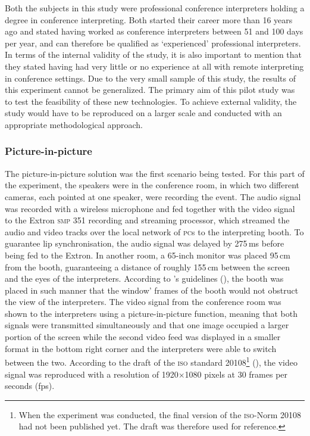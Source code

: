 \documentclass[output=paper]{langsci/langscibook}
\begin{document}
Both the subjects in this study were professional conference interpreters holding a degree in conference interpreting. Both started their career more than 16 years ago and stated having worked as conference interpreters between 51 and 100 days per year, and can therefore be qualified as ‘experienced’ professional interpreters. In terms of the internal validity of the study, it is also important to mention that they stated having had very little or no experience at all with remote interpreting in conference settings. Due to the very small sample of this study, the results of this experiment cannot be generalized. The primary aim of this pilot study was to test the feasibility of these new technologies. To achieve external validity, the study would have to be reproduced on a larger scale and conducted with an appropriate methodological approach.

\subsubsection{Picture-in-picture} 
\largerpage
The picture-in-picture solution was the first scenario being tested. For this part of the experiment, the speakers were in the conference room, in which two different cameras, each pointed at one speaker, were recording the event. The audio signal was recorded with a wireless microphone and fed together with the video signal to the Extron \textsc{smp 351} recording and streaming processor, which streamed the audio and video tracks over the local network of \textsc{pc}s to the interpreting booth. To guarantee lip synchronisation, the audio signal was delayed by 275\,ms before being fed to the Extron. In another room, a 65-inch monitor was placed 95\,cm from the booth, guaranteeing a distance of roughly 155\,cm between the screen and the eyes of the interpreters. According to \citeauthor{Causo2011}’s guidelines (\citeyear[2]{Causo2011}), the booth was placed in such manner that the window’ frames of the booth would not obstruct the view of the interpreters. The video signal from the conference room was shown to the interpreters using a picture-in-picture function, meaning that both signals were transmitted simultaneously and that one image occupied a larger portion of the screen while the second video feed was displayed in a smaller format in the bottom right corner and the interpreters were able to switch between the two. According to the draft of the \textsc{iso} standard \textsc{20108}\footnote{When the experiment was conducted, the final version of the \textsc{iso}-Norm \textsc{20108} had not been published yet. The draft was therefore used for reference.} (\citeyear[6]{ISO20108}), the video signal was reproduced with a resolution of 1920$\times$1080 pixels at 30 frames per seconds (fps). 
\end{document}
